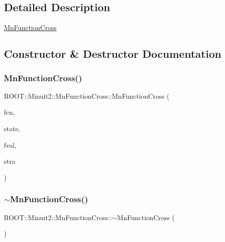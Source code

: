 \subsection{Detailed Description}
\mbox{\hyperlink{classROOT_1_1Minuit2_1_1MnFunctionCross}{Mn\+Function\+Cross}} 

\subsection{Constructor \& Destructor Documentation}
\mbox{\label{classROOT_1_1Minuit2_1_1MnFunctionCross_a553cffc846a7ffc94ef777c660862f80}} 
\subsubsection{\texorpdfstring{MnFunctionCross()}{MnFunctionCross()}\hspace{0.1cm}{\footnotesize\ttfamily [1/2]}}
{\footnotesize\ttfamily R\+O\+O\+T\+::\+Minuit2\+::\+Mn\+Function\+Cross\+::\+Mn\+Function\+Cross (\begin{DoxyParamCaption}\item[{const \mbox{\hyperlink{classROOT_1_1Minuit2_1_1FCNBase}{F\+C\+N\+Base}} \&}]{fcn,  }\item[{const \mbox{\hyperlink{classROOT_1_1Minuit2_1_1MnUserParameterState}{Mn\+User\+Parameter\+State}} \&}]{state,  }\item[{double}]{fval,  }\item[{const \mbox{\hyperlink{classROOT_1_1Minuit2_1_1MnStrategy}{Mn\+Strategy}} \&}]{stra }\end{DoxyParamCaption})\hspace{0.3cm}{\ttfamily [inline]}}

\mbox{\label{classROOT_1_1Minuit2_1_1MnFunctionCross_a6eddadf7793152d1c7a4604b2f374035}} 
\subsubsection{\texorpdfstring{$\sim$MnFunctionCross()}{~MnFunctionCross()}\hspace{0.1cm}{\footnotesize\ttfamily [1/2]}}
{\footnotesize\ttfamily R\+O\+O\+T\+::\+Minuit2\+::\+Mn\+Function\+Cross\+::$\sim$\+Mn\+Function\+Cross (\begin{DoxyParamCaption}{ }\end{DoxyParamCaption})\hspace{0.3cm}{\ttfamily [inline]}}

